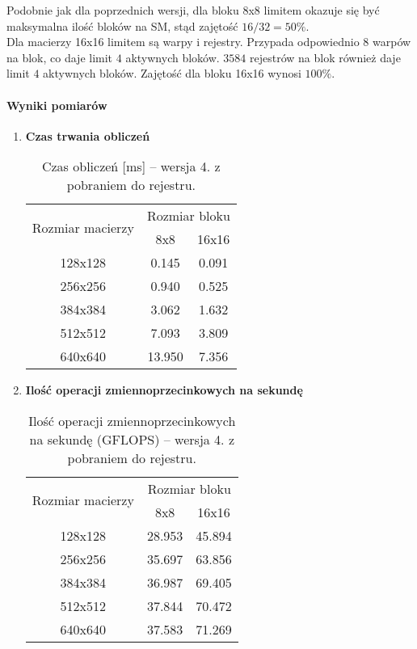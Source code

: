 Podobnie jak dla poprzednich wersji, dla bloku 8x8 limitem okazuje się być maksymalna ilość bloków na SM, stąd zajętość $ 16 / 32 = 50\% $. \\
Dla macierzy 16x16 limitem są warpy i rejestry. Przypada odpowiednio $ 8 $ warpów na blok, co daje limit $ 4 $ aktywnych bloków. $ 3584 $ rejestrów na blok również daje limit $ 4 $ aktywnych bloków. Zajętość dla bloku 16x16 wynosi $ 100\% $. \\


\paragraph{Wyniki pomiarów}

\begin{enumerate}

\item \textbf{Czas trwania obliczeń} \newline

\begin{table}[H]
\centering
\begin{tabular}{|c|c|c|}
\hline
\multirow{2}{*}{Rozmiar macierzy} & \multicolumn{2}{c|}{Rozmiar bloku} \\ \cline{2-3}
& 8x8 & 16x16 \\ \hline
128x128 & 0.145 & 0.091 \\ \hline
256x256 & 0.940 & 0.525 \\ \hline
384x384 & 3.062 & 1.632 \\ \hline
512x512 & 7.093 & 3.809 \\ \hline
640x640 & 13.950 & 7.356 \\ \hline
\end{tabular}
\caption{Czas obliczeń [ms] -- wersja 4. z pobraniem do rejestru.}
\end{table}

\item \textbf{Ilość operacji zmiennoprzecinkowych na sekundę} \newline

\begin{table}[H]
\centering
\begin{tabular}{|c|c|c|}
\hline
\multirow{2}{*}{Rozmiar macierzy} & \multicolumn{2}{c|}{Rozmiar bloku} \\ \cline{2-3}
& 8x8 & 16x16 \\ \hline
128x128 & 28.953 & 45.894 \\ \hline
256x256 & 35.697 & 63.856 \\ \hline
384x384 & 36.987 & 69.405 \\ \hline
512x512 & 37.844 & 70.472 \\ \hline
640x640 & 37.583 & 71.269 \\ \hline
\end{tabular}
\caption{Ilość operacji zmiennoprzecinkowych na sekundę (GFLOPS) -- wersja 4. z pobraniem do rejestru.}
\end{table}


\end{enumerate}
